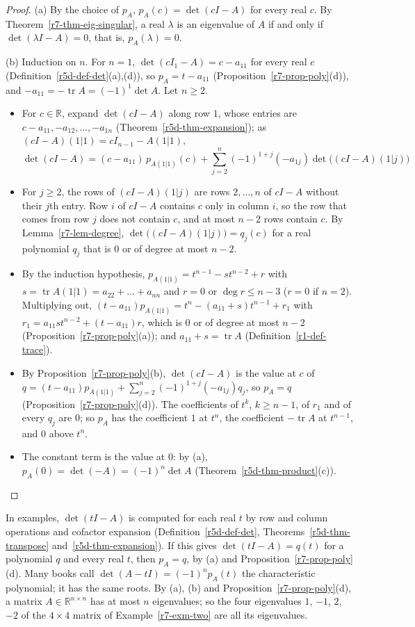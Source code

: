 \documentclass[12pt]{article}
\newcommand{\R}{\mathbb R}
\DeclareMathOperator{\tr}{tr}
\theoremstyle{definition}
\begin{document}
\begin{proof}
(a) By the choice of \(p_A\), \(p_A(c)=\det(cI-A)\) for every real \(c\). By Theorem~\ref{r7-thm-eig-singular}, a real
\(\lambda\) is an eigenvalue of \(A\) if and only if \(\det(\lambda I-A)=0\), that is, \(p_A(\lambda)=0\).

(b) Induction on \(n\). For \(n=1\), \(\det(cI_1-A)=c-a_{11}\) for every real \(c\)
(Definition~\ref{r5d-def-det}(a),(d)), so \(p_A=t-a_{11}\)
(Proposition~\ref{r7-prop-poly}(d)), and \(-a_{11}=-\tr A=(-1)^1\det A\). Let \(n\geqslant2\).
\begin{itemize}
\item For \(c\in\R\), expand \(\det(cI-A)\) along row \(1\), whose entries are \(c-a_{11},-a_{12},\dots,-a_{1n}\)
(Theorem~\ref{r5d-thm-expansion}); as \((cI-A)(1|1)=cI_{n-1}-A(1|1)\),
\[
\det(cI-A)=(c-a_{11})\,p_{A(1|1)}(c)+\sum_{j=2}^n(-1)^{1+j}(-a_{1j})\det\bigl((cI-A)(1|j)\bigr)
\]
\item For \(j\geqslant2\), the rows of \((cI-A)(1|j)\) are rows \(2,\dots,n\) of \(cI-A\) without their \(j\)th entry.
Row \(i\) of \(cI-A\) contains \(c\) only in column \(i\), so the row that comes from row \(j\) does not contain \(c\),
and at most \(n-2\) rows contain \(c\). By Lemma~\ref{r7-lem-degree}, \(\det\bigl((cI-A)(1|j)\bigr)=q_j(c)\) for a real
polynomial \(q_j\) that is \(0\) or of degree at most \(n-2\).
\item By the induction hypothesis, \(p_{A(1|1)}=t^{n-1}-st^{n-2}+r\) with \(s=\tr A(1|1)=a_{22}+\dots+a_{nn}\) and
\(r=0\) or \(\deg r\leqslant n-3\) (\(r=0\) if \(n=2\)). Multiplying out,
\((t-a_{11})p_{A(1|1)}=t^n-(a_{11}+s)t^{n-1}+r_1\) with \(r_1=a_{11}st^{n-2}+(t-a_{11})r\), which is \(0\) or of degree
at most \(n-2\) (Proposition~\ref{r7-prop-poly}(a)); and \(a_{11}+s=\tr A\) (Definition~\ref{r1-def-trace}).
\item By Proposition~\ref{r7-prop-poly}(b), \(\det(cI-A)\) is the value at \(c\) of
\(q=(t-a_{11})p_{A(1|1)}+\sum_{j=2}^n(-1)^{1+j}(-a_{1j})q_j\), so \(p_A=q\) (Proposition~\ref{r7-prop-poly}(d)). The
coefficients of \(t^k\), \(k\geqslant n-1\), of \(r_1\) and of every \(q_j\) are \(0\); so \(p_A\) has the coefficient
\(1\) at \(t^n\), the coefficient \(-\tr A\) at \(t^{n-1}\), and \(0\) above \(t^n\).
\item The constant term is the value at \(0\): by (a), \(p_A(0)=\det(-A)=(-1)^n\det A\)
(Theorem~\ref{r5d-thm-product}(c)).\qedhere
\end{itemize}
\end{proof}
In examples, \(\det(tI-A)\) is computed for each real \(t\) by row and column operations and cofactor expansion
(Definition~\ref{r5d-def-det}, Theorems~\ref{r5d-thm-transpose} and~\ref{r5d-thm-expansion}). If this gives
\(\det(tI-A)=q(t)\) for a polynomial \(q\) and every real \(t\), then \(p_A=q\), by (a) and
Proposition~\ref{r7-prop-poly}(d). Many books call \(\det(A-tI)=(-1)^np_A(t)\) the characteristic polynomial; it has
the same roots. By (a), (b) and Proposition~\ref{r7-prop-poly}(d), a matrix \(A\in\R^{n\times n}\) has at most \(n\)
eigenvalues; so the four eigenvalues \(1\), \(-1\), \(2\), \(-2\) of the \(4\times4\) matrix of
Example~\ref{r7-exm-two} are all its eigenvalues.
\end{document}
